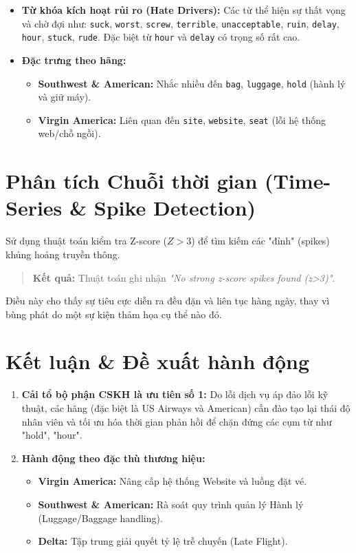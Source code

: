 \documentclass{article}
\begin{document}
\begin{itemize}
    \item \textbf{Từ khóa kích hoạt rủi ro (Hate Drivers):} Các từ thể hiện sự thất vọng và chờ đợi như: \texttt{suck}, \texttt{worst}, \texttt{screw}, \texttt{terrible}, \texttt{unacceptable}, \texttt{ruin}, \texttt{delay}, \texttt{hour}, \texttt{stuck}, \texttt{rude}. Đặc biệt từ \texttt{hour} và \texttt{delay} có trọng số rất cao.
    \item \textbf{Đặc trưng theo hãng:}
    \begin{itemize}
        \item \textbf{Southwest \& American:} Nhắc nhiều đến \texttt{bag}, \texttt{luggage}, \texttt{hold} (hành lý và giữ máy).
        \item \textbf{Virgin America:} Liên quan đến \texttt{site}, \texttt{website}, \texttt{seat} (lỗi hệ thống web/chỗ ngồi).
    \end{itemize}
\end{itemize}

\section{Phân tích Chuỗi thời gian (Time-Series \& Spike Detection)}
Sử dụng thuật toán kiểm tra Z-score ($Z > 3$) để tìm kiếm các "đỉnh" (spikes) khủng hoảng truyền thông.

\begin{quote}
    \textbf{Kết quả:} Thuật toán ghi nhận \textit{"No strong z-score spikes found (z>3)"}. 
\end{quote}
Điều này cho thấy sự tiêu cực diễn ra đều đặn và liên tục hàng ngày, thay vì bùng phát do một sự kiện thảm họa cụ thể nào đó.

\hr
\section*{  Kết luận \& Đề xuất hành động}
\begin{enumerate}
    \item \textbf{Cải tổ bộ phận CSKH là ưu tiên số 1:} Do lỗi dịch vụ áp đảo lỗi kỹ thuật, các hãng (đặc biệt là US Airways và American) cần đào tạo lại thái độ nhân viên và tối ưu hóa thời gian phản hồi để chặn đứng các cụm từ như "hold", "hour".
    \item \textbf{Hành động theo đặc thù thương hiệu:}
    \begin{itemize}
        \item \textbf{Virgin America:} Nâng cấp hệ thống Website và luồng đặt vé.
        \item \textbf{Southwest \& American:} Rà soát quy trình quản lý Hành lý (Luggage/Baggage handling).
        \item \textbf{Delta:} Tập trung giải quyết tỷ lệ trễ chuyến (Late Flight).
    \end{itemize}
\end{enumerate}
\end{document}
